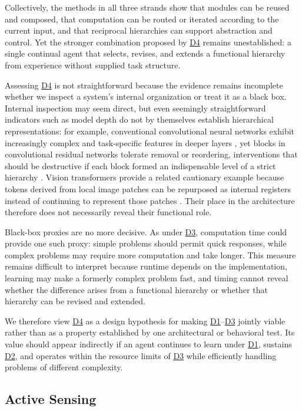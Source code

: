 \documentclass[10pt,journal,compsoc]{IEEEtran}
\DeclareRobustCommand{\Dref}[1]{\hyperref[sec:d#1]{D#1}}
\begin{document}
Collectively, the methods in all three strands show that modules can be reused and composed, that computation can be routed or iterated according to the current input, and that reciprocal hierarchies can support abstraction and control.
Yet the stronger combination proposed by \Dref{4} remains unestablished: a single continual agent that selects, revises, and extends a functional hierarchy from experience without supplied task structure.

Assessing \Dref{4} is not straightforward because the evidence remains incomplete whether we inspect a system's internal organization or treat it as a black box.
Internal inspection may seem direct, but even seemingly straightforward indicators such as model depth do not by themselves establish hierarchical representations: for example, conventional convolutional neural networks exhibit increasingly complex and task-specific features in deeper layers \cite{zeiler2014,yosinski2014}, yet blocks in convolutional residual networks tolerate removal or reordering, interventions that should be destructive if each block formed an indispensable level of a strict hierarchy \cite{veit2016}.
Vision transformers provide a related cautionary example because tokens derived from local image patches can be repurposed as internal registers instead of continuing to represent those patches \cite{darcet2024}.
Their place in the architecture therefore does not necessarily reveal their functional role.

Black-box proxies are no more decisive.
As under \Dref{3}, computation time could provide one such proxy: simple problems should permit quick responses, while complex problems may require more computation and take longer.
This measure remains difficult to interpret because runtime depends on the implementation, learning may make a formerly complex problem fast, and timing cannot reveal whether the difference arises from a functional hierarchy or whether that hierarchy can be revised and extended.

We therefore view \Dref{4} as a design hypothesis for making \Dref{1}--\Dref{3} jointly viable rather than as a property established by one architectural or behavioral test.
Its value should appear indirectly if an agent continues to learn under \Dref{1}, sustains \Dref{2}, and operates within the resource limits of \Dref{3} while efficiently handling problems of different complexity.

\subsection{Active Sensing}
\label{sec:d5}
\end{document}
